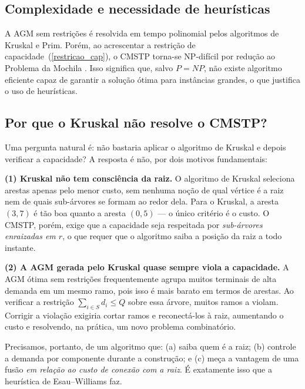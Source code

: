 \documentclass[12pt]{article}
\begin{document}
\subsection{Complexidade e necessidade de heurísticas}

A AGM sem restrições é resolvida em tempo polinomial pelos algoritmos de Kruskal \cite{kruskal1956} e Prim. Porém, ao acrescentar a restrição de capacidade~(\ref{restricao_cap}), o CMSTP torna-se NP-difícil por redução ao Problema da Mochila \cite{garey1979}. Isso significa que, salvo $P=NP$, não existe algoritmo eficiente capaz de garantir a solução ótima para instâncias grandes, o que justifica o uso de heurísticas.

\subsection{Por que o Kruskal não resolve o CMSTP?}

Uma pergunta natural é: não bastaria aplicar o algoritmo de Kruskal \cite{kruskal1956} e depois verificar a capacidade? A resposta é não, por dois motivos fundamentais:

\textbf{(1) Kruskal não tem consciência da raiz.} O algoritmo de Kruskal seleciona arestas apenas pelo menor custo, sem nenhuma noção de qual vértice é a raiz nem de quais sub-árvores se formam ao redor dela. Para o Kruskal, a aresta $(3, 7)$ é tão boa quanto a aresta $(0, 5)$ --- o único critério é o custo. O CMSTP, porém, exige que a capacidade seja respeitada por \emph{sub-árvores enraizadas em $r$}, o que requer que o algoritmo saiba a posição da raiz a todo instante.

\textbf{(2) A AGM gerada pelo Kruskal quase sempre viola a capacidade.} A AGM ótima sem restrições frequentemente agrupa muitos terminais de alta demanda em um mesmo ramo, pois isso é mais barato em termos de arestas. Ao verificar a restrição $\sum_{i \in S} d_i \leq Q$ sobre essa árvore, muitos ramos a violam. Corrigir a violação exigiria cortar ramos e reconectá-los à raiz, aumentando o custo e resolvendo, na prática, um novo problema combinatório.

Precisamos, portanto, de um algoritmo que: (a) saiba quem é a raiz; (b) controle a demanda por componente durante a construção; e (c) meça a vantagem de uma fusão \emph{em relação ao custo de conexão com a raiz}. É exatamente isso que a heurística de Esau--Williams faz.


\end{document}
